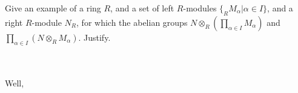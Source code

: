 Give an example of a ring $R$, and a set of left $R$-modules $\{_RM_{\alpha}|\alpha\in I\}$, and a right
$R$-module $N_R$, for which the abelian groups $N\otimes_R(\prod_{\alpha\in I}M_{\alpha})$ and
$\prod_{\alpha\in I}(N\otimes_RM_{\alpha})$. Justify.\\\\

\begin{solution}\renewcommand{\qedsymbol}{}\ \\
    Well,
\end{solution}